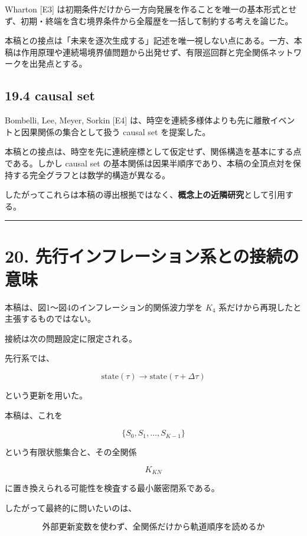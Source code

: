 \documentclass[
  a4paper,
]{ltjsarticle}
\begin{document}
Wharton {[}E3{]}
は初期条件だけから一方向発展を作ることを唯一の基本形式とせず、初期・終端を含む境界条件から全履歴を一括して制約する考えを論じた。

本稿との接点は「未来を逐次生成する」記述を唯一視しない点にある。一方、本稿は作用原理や連続場境界値問題から出発せず、有限巡回群と完全関係ネットワークを出発点とする。

\subsection{19.4 causal set}\label{causal-set}

Bombelli, Lee, Meyer, Sorkin {[}E4{]}
は、時空を連続多様体よりも先に離散イベントと因果関係の集合として扱う
causal set を提案した。

本稿との接点は、時空を先に連続座標として仮定せず、関係構造を基本にする点である。しかし
causal set
の基本関係は因果半順序であり、本稿の全頂点対を保持する完全グラフとは数学的構造が異なる。

したがってこれらは本稿の導出根拠ではなく、\textbf{概念上の近隣研究}として引用する。

\begin{center}\rule{0.5\linewidth}{0.5pt}\end{center}

\section{20.
先行インフレーション系との接続の意味}\label{ux5148ux884cux30a4ux30f3ux30d5ux30ecux30fcux30b7ux30e7ux30f3ux7cfbux3068ux306eux63a5ux7d9aux306eux610fux5473}

本稿は、図1〜図4のインフレーション的関係波力学を \(K_4\)
系だけから再現したと主張するものではない。

接続は次の問題設定に限定される。

先行系では、

\[
\text{state}(\tau)
\to
\text{state}(\tau+\Delta\tau)
\]

という更新を用いた。

本稿は、これを

\[
\{S_0,S_1,\ldots,S_{K-1}\}
\]

という有限状態集合と、その全関係

\[
K_{KN}
\]

に置き換えられる可能性を検査する最小厳密閉系である。

したがって最終的に問いたいのは、

\[
\boxed{
\text{外部更新変数を使わず、全関係だけから軌道順序を読めるか}
}
\]
\end{document}

